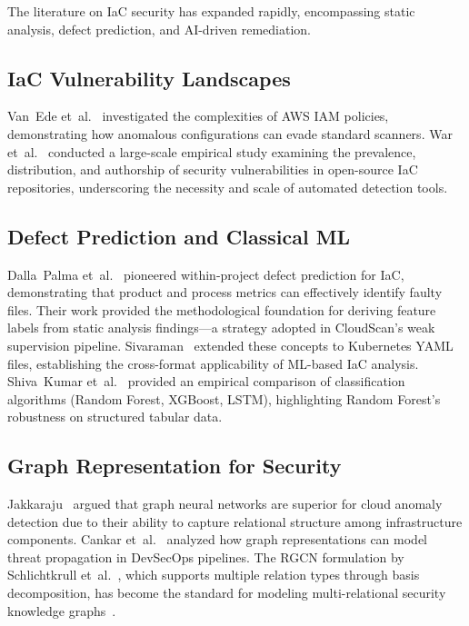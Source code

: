 \documentclass[conference]{IEEEtran}
\begin{document}
The literature on IaC security has expanded rapidly, encompassing static analysis, defect prediction, and AI-driven remediation.

\subsection{IaC Vulnerability Landscapes}

Van~Ede et~al.~\cite{vanede2023} investigated the complexities of AWS IAM policies, demonstrating how anomalous configurations can evade standard scanners. War et~al.~\cite{war2022} conducted a large-scale empirical study examining the prevalence, distribution, and authorship of security vulnerabilities in open-source IaC repositories, underscoring the necessity and scale of automated detection tools.

\subsection{Defect Prediction and Classical ML}

Dalla~Palma et~al.~\cite{dallapalma2020} pioneered within-project defect prediction for IaC, demonstrating that product and process metrics can effectively identify faulty files. Their work provided the methodological foundation for deriving feature labels from static analysis findings---a strategy adopted in CloudScan's weak supervision pipeline. Sivaraman~\cite{sivaraman2023} extended these concepts to Kubernetes YAML files, establishing the cross-format applicability of ML-based IaC analysis. Shiva~Kumar et~al.~\cite{shivakumar2023} provided an empirical comparison of classification algorithms (Random Forest, XGBoost, LSTM), highlighting Random Forest's robustness on structured tabular data.

\subsection{Graph Representation for Security}

Jakkaraju~\cite{jakkaraju2024} argued that graph neural networks are superior for cloud anomaly detection due to their ability to capture relational structure among infrastructure components. Cankar et~al.~\cite{cankar2021} analyzed how graph representations can model threat propagation in DevSecOps pipelines. The RGCN formulation by Schlichtkrull et~al.~\cite{schlichtkrull2018}, which supports multiple relation types through basis decomposition, has become the standard for modeling multi-relational security knowledge graphs~\cite{cloudy2023}.
\end{document}
